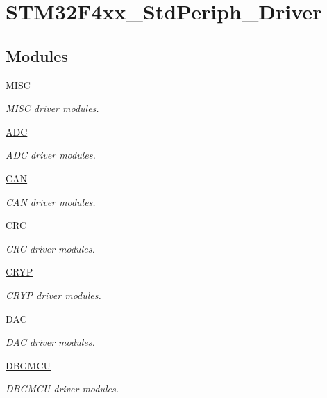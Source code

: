 \hypertarget{group___s_t_m32_f4xx___std_periph___driver}{}\section{S\+T\+M32\+F4xx\+\_\+\+Std\+Periph\+\_\+\+Driver}
\label{group___s_t_m32_f4xx___std_periph___driver}
\subsection*{Modules}
\begin{DoxyCompactItemize}
\item 
\hyperlink{group___m_i_s_c}{M\+I\+S\+C}
\begin{DoxyCompactList}\small\item\em M\+I\+S\+C driver modules. \end{DoxyCompactList}\item 
\hyperlink{group___a_d_c}{A\+D\+C}
\begin{DoxyCompactList}\small\item\em A\+D\+C driver modules. \end{DoxyCompactList}\item 
\hyperlink{group___c_a_n}{C\+A\+N}
\begin{DoxyCompactList}\small\item\em C\+A\+N driver modules. \end{DoxyCompactList}\item 
\hyperlink{group___c_r_c}{C\+R\+C}
\begin{DoxyCompactList}\small\item\em C\+R\+C driver modules. \end{DoxyCompactList}\item 
\hyperlink{group___c_r_y_p}{C\+R\+Y\+P}
\begin{DoxyCompactList}\small\item\em C\+R\+Y\+P driver modules. \end{DoxyCompactList}\item 
\hyperlink{group___d_a_c}{D\+A\+C}
\begin{DoxyCompactList}\small\item\em D\+A\+C driver modules. \end{DoxyCompactList}\item 
\hyperlink{group___d_b_g_m_c_u}{D\+B\+G\+M\+C\+U}
\begin{DoxyCompactList}\small\item\em D\+B\+G\+M\+C\+U driver modules. \end{DoxyCompactList}\item 

\end{DoxyCompactItemize}
